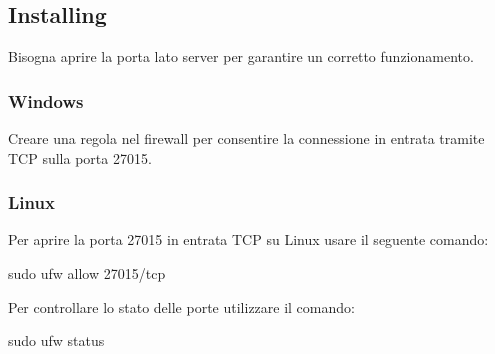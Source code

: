 \subsection*{Installing}

Bisogna aprire la porta lato server per garantire un corretto funzionamento.

\subsubsection*{Windows}

Creare una regola nel firewall per consentire la connessione in entrata tramite T\+CP sulla porta 27015.

\subsubsection*{Linux}

Per aprire la porta 27015 in entrata T\+CP su Linux usare il seguente comando\+: 
\begin{DoxyCode}
sudo ufw allow 27015/tcp
\end{DoxyCode}


Per controllare lo stato delle porte utilizzare il comando\+:


\begin{DoxyCode}
sudo ufw status
\end{DoxyCode}
 